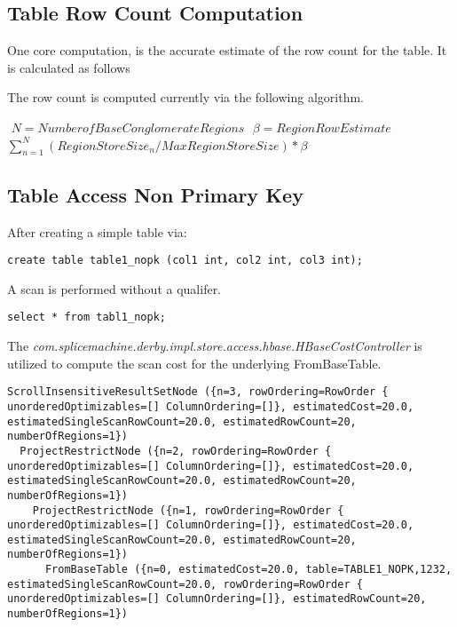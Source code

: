 \subsection{Table Row Count Computation}

One core computation, is the accurate estimate of the row count for the table. 
It is calculated as follows

The row count is computed currently via the following algorithm.

$ $
$ N=Number of Base Conglomerate Regions$
$ $
$ \beta=Region Row Estimate $
$ $
$\sum_{n=1}^{N}(RegionStoreSize_n/MaxRegionStoreSize)*\beta$
$ $

\lstset{ %
language=C++,           %
numberstyle=\tiny,      %
basicstyle=\tiny    %
}



\subsection{Table Access Non Primary Key}

After creating a simple table via:

\begin{verbatim}
create table table1_nopk (col1 int, col2 int, col3 int);
\end{verbatim}

A scan is performed without a qualifer.

\begin{verbatim}
select * from tabl1_nopk;
\end{verbatim}

  The
  \emph{com.splicemachine.derby.impl.store.access.hbase.HBaseCostController}
  is utilized to compute the scan cost for the underlying FromBaseTable. 

\begin{lstlisting}
ScrollInsensitiveResultSetNode ({n=3, rowOrdering=RowOrder { unorderedOptimizables=[] ColumnOrdering=[]}, estimatedCost=20.0, estimatedSingleScanRowCount=20.0, estimatedRowCount=20, numberOfRegions=1})
  ProjectRestrictNode ({n=2, rowOrdering=RowOrder { unorderedOptimizables=[] ColumnOrdering=[]}, estimatedCost=20.0, estimatedSingleScanRowCount=20.0, estimatedRowCount=20, numberOfRegions=1})
    ProjectRestrictNode ({n=1, rowOrdering=RowOrder { unorderedOptimizables=[] ColumnOrdering=[]}, estimatedCost=20.0, estimatedSingleScanRowCount=20.0, estimatedRowCount=20, numberOfRegions=1})
      FromBaseTable ({n=0, estimatedCost=20.0, table=TABLE1_NOPK,1232, estimatedSingleScanRowCount=20.0, rowOrdering=RowOrder { unorderedOptimizables=[] ColumnOrdering=[]}, estimatedRowCount=20, numberOfRegions=1})
\end{lstlisting}     

